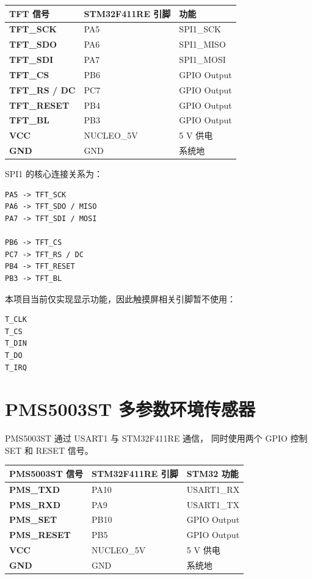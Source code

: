 \documentclass[12pt,a4paper]{ctexart}
\begin{document}
\begin{table}[htbp]
\centering
{}
\begin{tabularx}{0.95\textwidth}{>{\bfseries}Y Y Y}
\toprule
{}
\color{white}TFT 信号 &
\color{white}STM32F411RE 引脚 &
\color{white}功能 \\
\midrule
TFT\_SCK & PA5 & SPI1\_SCK \\
TFT\_SDO & PA6 & SPI1\_MISO \\
TFT\_SDI & PA7 & SPI1\_MOSI \\
TFT\_CS & PB6 & GPIO Output \\
TFT\_RS / DC & PC7 & GPIO Output \\
TFT\_RESET & PB4 & GPIO Output \\
TFT\_BL & PB3 & GPIO Output \\
VCC & NUCLEO\_5V & 5 V 供电 \\
GND & GND & 系统地 \\
\bottomrule
\end{tabularx}
\end{table}

SPI1 的核心连接关系为：

\begin{verbatim}
PA5 -> TFT_SCK
PA6 -> TFT_SDO / MISO
PA7 -> TFT_SDI / MOSI

PB6 -> TFT_CS
PC7 -> TFT_RS / DC
PB4 -> TFT_RESET
PB3 -> TFT_BL
\end{verbatim}

本项目当前仅实现显示功能，因此触摸屏相关引脚暂不使用：

\begin{verbatim}
T_CLK
T_CS
T_DIN
T_DO
T_IRQ
\end{verbatim}

\section{PMS5003ST 多参数环境传感器}

PMS5003ST 通过 USART1 与 STM32F411RE 通信，
同时使用两个 GPIO 控制 SET 和 RESET 信号。

\begin{table}[htbp]
\centering
{}
\begin{tabularx}{0.95\textwidth}{>{\bfseries}Y Y Y}
\toprule
{}
\color{white}PMS5003ST 信号 &
\color{white}STM32F411RE 引脚 &
\color{white}STM32 功能 \\
\midrule
PMS\_TXD & PA10 & USART1\_RX \\
PMS\_RXD & PA9 & USART1\_TX \\
PMS\_SET & PB10 & GPIO Output \\
PMS\_RESET & PB5 & GPIO Output \\
VCC & NUCLEO\_5V & 5 V 供电 \\
GND & GND & 系统地 \\
\bottomrule
\end{tabularx}
\end{table}
\end{document}

